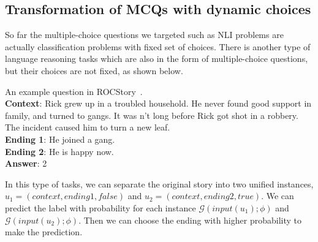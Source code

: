 \subsection{Transformation of MCQs with dynamic choices}
\label{sec:dynamic}
So far the multiple-choice questions we targeted such as NLI problems
are actually classification problems with fixed set of choices. There is
another type of language reasoning tasks which are also in the form of
multiple-choice questions, but their choices are not fixed, as shown
below. 
\begin{example}\label{exp:roc}
An example question in ROCStory~\cite{mostafazadeh2016corpus}.\\
\noindent
\textbf{Context}: Rick grew up in a troubled household. 
He never found good support in family, and turned to gangs.           
It was n't long before Rick got shot in a robbery.             
The incident caused him to turn a new leaf.\\
\noindent
\textbf{Ending 1}: He joined a gang. \\
\noindent
\textbf{Ending 2}:  He is happy now.\\
\noindent
\textbf{Answer}: 2
\end{example}

In this type of tasks,
we can separate the original story into two unified instances, 
$u_1=(context, ending1, false)$ and $u_2=(context, ending2, true)$.
We can predict the label with probability for each instance $\mathcal{G}(input(u_1);\phi)$ and 
 $\mathcal{G}(input(u_2);\phi)$.
Then we can choose the ending with higher probability to make the prediction.

 

